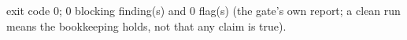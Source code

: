 exit code 0; 0 blocking finding(s) and 0 flag(s) (the gate's own report; a clean run means the bookkeeping holds, not that any claim is true).
